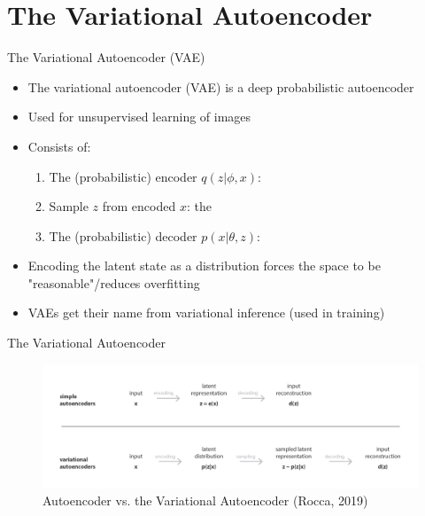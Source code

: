 \documentclass[10pt]{beamer}
\begin{document}
\section{The Variational Autoencoder}
\frame{\sectionpage}

\begin{frame}{The Variational Autoencoder (VAE)}
\begin{itemize}
\item The variational autoencoder (VAE) is a {\color{uured} deep probabilistic autoencoder}
\item Used for unsupervised learning of {\color{uured} images}\pause
\item Consists of:
\begin{enumerate}
\item The (probabilistic) encoder $q(z|\phi, x)$: \pause
\item Sample $z$ from encoded $x$: the \pause
\item The (probabilistic) decoder $p(x|\theta, z)$: 
\end{enumerate}
\pause
\item Encoding the {\color{uured} latent state as a distribution} forces the space to be "reasonable"/reduces overfitting
\pause
\item VAEs get their name from {\color{uured} variational inference} (used in training)
\end{itemize}

\end{frame}


\begin{frame}{The Variational Autoencoder}

\begin{figure}[h]
\centering
\includegraphics[width=1\textwidth]{fig/Rocca_AE_vs_VAE.png}
\caption{Autoencoder vs. the Variational Autoencoder (Rocca, 2019)}
\end{figure}

\end{frame}
\end{document}
